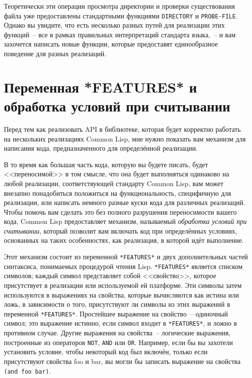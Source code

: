 Теоретически эти операции просмотра директории и проверки существования файла уже
предоставлены стандартными функциями \lstinline{DIRECTORY} и \lstinline{PROBE-FILE}. Однако вы
увидите, что есть несколько разных путей для реализации этих функций~-- все в рамках
правильных интерпретаций стандарта языка,~-- и вам захочется написать новые функции,
которые предоставят единообразное поведение для разных реализаций.

\section{Переменная *FEATURES* и обработка условий при считывании}

Перед тем как реализовать API в библиотеке, которая будет корректно работать на
нескольких реализациях Common Lisp, мне нужно показать вам механизм для написания кода,
предназначенного для определённой реализации.

В то время как большая часть кода, которую вы будете писать, будет <<переносимой>> в том
смысле, что она будет выполняться одинаково на любой реализации, соответствующей стандарту
Common Lisp, вам может внезапно понадобиться положиться на функциональность, специфичную
для реализации, или написать немного разные куски кода для различных реализаций. Чтобы
помочь вам сделать это без полного разрушения переносимости вашего кода, Common Lisp
предоставляет механизм, называемый \textit{обработка условий при считывании}, который
позволит вам включать код при определённых условиях, основанных на таких особенностях, как
реализация, в которой идёт выполнение.

Этот механизм состоит из переменной \lstinline{*FEATURES*} и двух дополнительных частей
синтаксиса, понимаемых процедурой чтения Lisp. \lstinline{*FEATURES*} является списком символов;
каждый символ представляет собой <<свойство>>, которое присутствует в реализации или
используемой ей платформе. Эти символы затем используются в выражениях на свойства,
которые вычисляются как истина или ложь, в зависимости о того, присутствуют ли символы из
этих выражений в переменной \lstinline{*FEATURES*}. Простейшее выражение на свойство~--
одиночный символ; это выражение истинно, если символ входит в \lstinline{*FEATURES*}, и ложно в
противном случае. Другие выражения на свойства~-- логические выражения, построенные из
операторов \lstinline{NOT}, \lstinline{AND} или \lstinline{OR}. Например, если бы вы захотели установить
условие, чтобы некоторый код был включён, только если присутствуют свойства foo и bar, вы
могли бы записать выражение на свойства \lstinline{(and foo bar)}.

